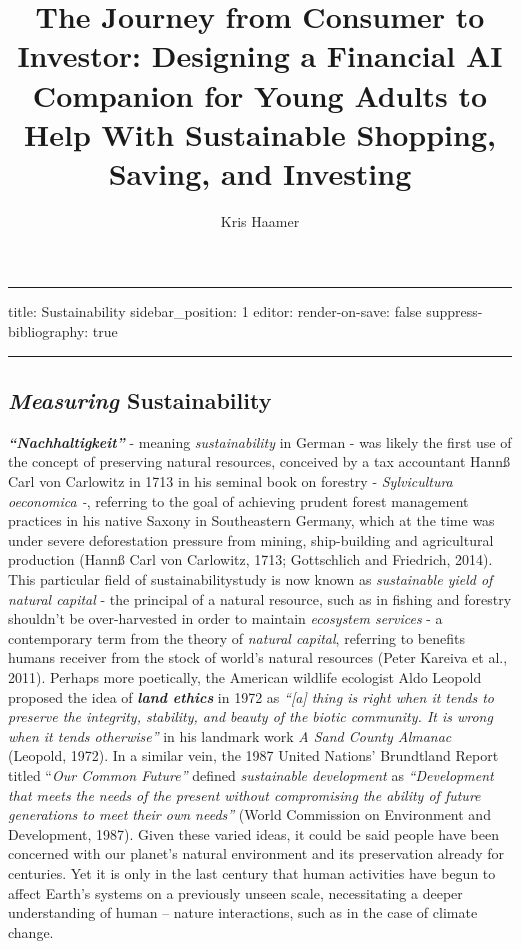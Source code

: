 \documentclass[
  letterpaper,
  DIV=11,
  numbers=noendperiod]{scrartcl}
\title{The Journey from Consumer to Investor: Designing a Financial AI
Companion for Young Adults to Help With Sustainable Shopping, Saving,
and Investing}
\author{Kris Haamer}
\date{}
\begin{document}
\maketitle


\begin{center}\rule{0.5\linewidth}{0.5pt}\end{center}

title: Sustainability sidebar\_position: 1 editor: render-on-save: false
suppress-bibliography: true

\begin{center}\rule{0.5\linewidth}{0.5pt}\end{center}

\subsection{\texorpdfstring{\emph{Measuring}
Sustainability}{Measuring Sustainability}}\label{measuring-sustainability}

\textbf{\emph{``Nachhaltigkeit''}} - meaning \emph{sustainability} in
German - was likely the first use of the concept of preserving natural
resources, conceived by a tax accountant Hannß Carl von Carlowitz in
1713 in his seminal book on forestry - \emph{Sylvicultura oeconomica -},
referring to the goal of achieving prudent forest management practices
in his native Saxony in Southeastern Germany, which at the time was
under severe deforestation pressure from mining, ship-building and
agricultural production (Hannß Carl von Carlowitz, 1713; Gottschlich and
Friedrich, 2014). This particular field of sustainabilitystudy is now
known as \emph{sustainable yield of natural capital} - the principal of
a natural resource, such as in fishing and forestry shouldn't be
over-harvested in order to maintain \emph{ecosystem services} - a
contemporary term from the theory of \emph{natural capital}, referring
to benefits humans receiver from the stock of world's natural resources
(Peter Kareiva et al., 2011). Perhaps more poetically, the American
wildlife ecologist Aldo Leopold proposed the idea of \textbf{\emph{land
ethics}} in 1972 as \emph{``{[}a{]} thing is right when it tends to
preserve the integrity, stability, and beauty of the biotic community.
It is wrong when it tends otherwise''} in his landmark work \emph{A Sand
County Almanac} (Leopold, 1972). In a similar vein, the 1987 United
Nations' Brundtland Report titled ``\emph{Our Common Future''} defined
\emph{sustainable development} as \emph{``Development that meets the
needs of the present without compromising the ability of future
generations to meet their own needs''} (World Commission on Environment
and Development, 1987). Given these varied ideas, it could be said
people have been concerned with our planet's natural environment and its
preservation already for centuries. Yet it is only in the last century
that human activities have begun to affect Earth's systems on a
previously unseen scale, necessitating a deeper understanding of human
-- nature interactions, such as in the case of climate change.
\end{document}
